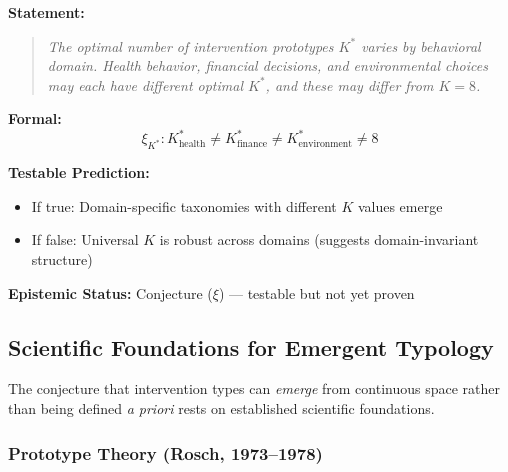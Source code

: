 \begin{tcolorbox}[colback=purple!5!white, colframe=purple!75!black,
    title=\textbf{Conjecture IE-CONJ-2: Domain-Specific $K^*$ ($\xi$)}]

\textbf{Statement:}
\begin{quote}
\textit{The optimal number of intervention prototypes $K^*$ varies by behavioral domain. Health behavior, financial decisions, and environmental choices may each have different optimal $K^*$, and these may differ from $K = 8$.}
\end{quote}

\textbf{Formal:}
\begin{equation}
\boxed{\xi_{K^*}: K^*_{\text{health}} \neq K^*_{\text{finance}} \neq K^*_{\text{environment}} \neq 8}
\end{equation}

\textbf{Testable Prediction:}
\begin{itemize}[nosep]
    \item If true: Domain-specific taxonomies with different $K$ values emerge
    \item If false: Universal $K$ is robust across domains (suggests domain-invariant structure)
\end{itemize}

\textbf{Epistemic Status:} Conjecture ($\xi$) --- testable but not yet proven

\end{tcolorbox}

\subsection{Scientific Foundations for Emergent Typology}
\label{subsec:scientific-foundations-typology}

The conjecture that intervention types can \textit{emerge} from continuous space rather than being defined \textit{a priori} rests on established scientific foundations.

\subsubsection{Prototype Theory (Rosch, 1973--1978)}

